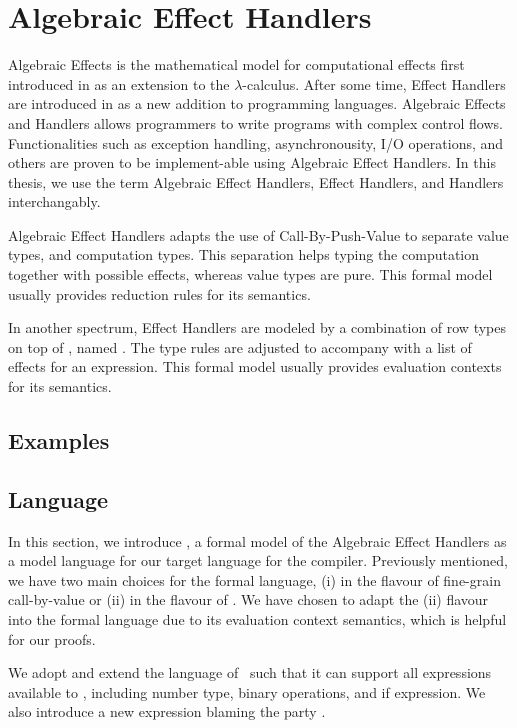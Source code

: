 \chapter{Algebraic Effect Handlers}
\label{chap:effects}

Algebraic Effects is the mathematical model for computational effects first introduced in \cite{plotkin2003algebraic} as an extension to the $\lambda$-calculus. After some time, Effect Handlers are introduced in \cite{plotkin2013handling} as a new addition to programming languages. Algebraic Effects and Handlers allows programmers to write programs with complex control flows. Functionalities such as exception handling, asynchronousity, I/O operations, and others are proven to be implement-able using Algebraic Effect Handlers. In this thesis, we use the term Algebraic Effect Handlers, Effect Handlers, and Handlers interchangably.

Algebraic Effect Handlers adapts the use of Call-By-Push-Value \cite{levy2013call} to separate value types, and computation types. This separation helps typing the computation together with possible effects, whereas value types are pure. This formal model usually provides reduction rules for its semantics.

In another spectrum, Effect Handlers are modeled by a combination of row types on top of \systemfw, named \systemfe \cite{xie2020effect}. The type rules are adjusted to accompany with a list of effects for an expression. This formal model usually provides evaluation contexts for its semantics.

\section{Examples}


\section{Language \lange}

In this section, we introduce \lange, a formal model of the Algebraic Effect Handlers as a model language for our target language for the compiler. Previously mentioned, we have two main choices for the formal language, (i) in the flavour of fine-grain call-by-value or (ii) in the flavour of \systemfe. We have chosen to adapt the (ii) flavour into the formal language due to its evaluation context semantics, which is helpful for our proofs.

We adopt and extend the language of \systemfe\ such that it can support all expressions available to \langc, including number type, binary operations, and if expression. We also introduce a new expression  blaming the party .

